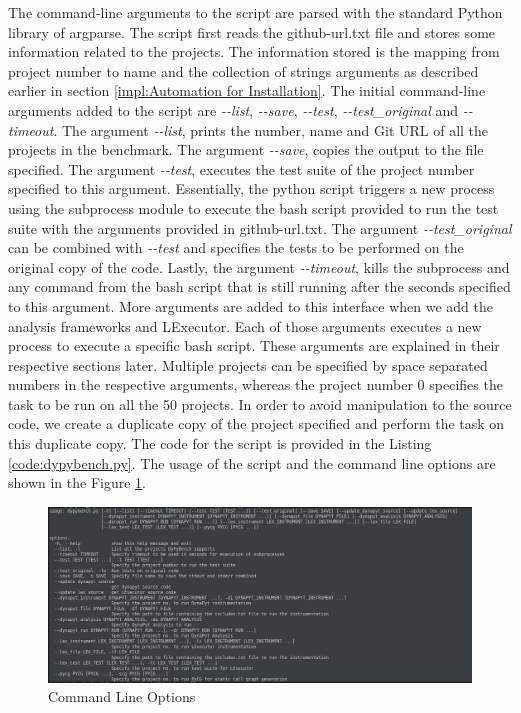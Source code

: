The command-line arguments to the script are parsed with the standard Python library of argparse.
The script first reads the github-url.txt file and stores some information related to the projects.
The information stored is the mapping from project number to name and the collection of strings arguments as described earlier in section \ref{impl:Automation for Installation}.
The initial command-line arguments added to the script are \textit{\--\--list}, \textit{\--\--save}, \textit{\--\--test}, \textit{\--\--test\_original} and \textit{\--\--timeout}.
The argument \textit{\--\--list}, prints the number, name and Git URL of all the projects in the benchmark.
The argument \textit{\--\--save}, copies the output to the file specified.
The argument \textit{\--\--test}, executes the test suite of the project number specified to this argument.
Essentially, the python script triggers a new process using the subprocess module to execute the bash script provided to run the test suite with the arguments provided in github-url.txt.
The argument \textit{\--\--test\_original} can be combined with \textit{\--\--test} and specifies the tests to be performed on the original copy of the code.  
Lastly, the argument \textit{\--\--timeout}, kills the subprocess and any command from the bash script that is still running after the seconds specified to this argument.  
More arguments are added to this interface when we add the analysis frameworks and LExecutor.
Each of those arguments executes a new process to execute a specific bash script.
These arguments are explained in their respective sections later.
Multiple projects can be specified by space separated numbers in the respective arguments, whereas the project number 0 specifies the task to be run on all the 50 projects.  
In order to avoid manipulation to the source code, we create a duplicate copy of the project specified and perform the task on this duplicate copy. 
The code for the script is provided in the Listing \ref{code:dypybench.py}.
The usage of the script and the command line options are shown in the Figure \ref{fig:command-line-options}.
\begin{figure}[ht]
    \centering
    \includegraphics[width=1\linewidth]{figures/implementation/command-line-options.png}
    \caption[Command Line Options]{\label{fig:command-line-options}Command Line Options}
\end{figure}

